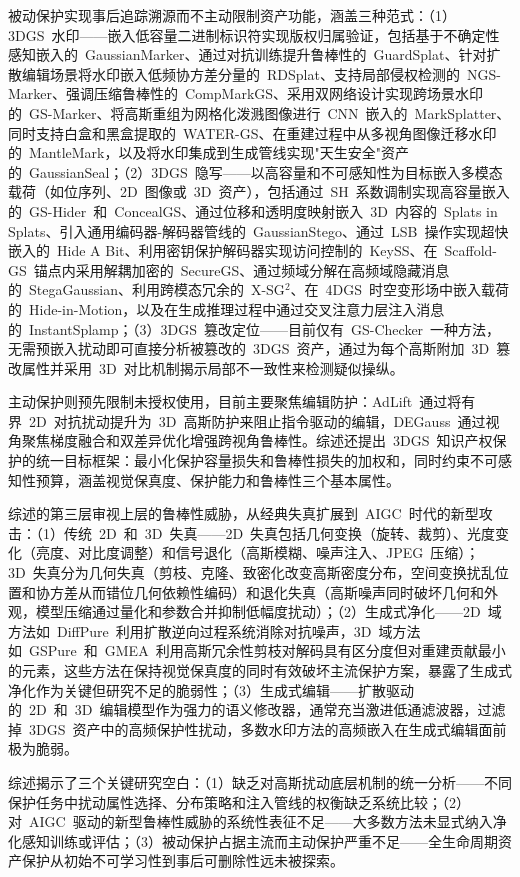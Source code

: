 被动保护实现事后追踪溯源而不主动限制资产功能，涵盖三种范式：（1）3DGS~水印——嵌入低容量二进制标识符实现版权归属验证，包括基于不确定性感知嵌入的~GaussianMarker、通过对抗训练提升鲁棒性的~GuardSplat、针对扩散编辑场景将水印嵌入低频协方差分量的~RDSplat、支持局部侵权检测的~NGS-Marker、强调压缩鲁棒性的~CompMarkGS、采用双网络设计实现跨场景水印的~GS-Marker、将高斯重组为网格化泼溅图像进行~CNN~嵌入的~MarkSplatter、同时支持白盒和黑盒提取的~WATER-GS、在重建过程中从多视角图像迁移水印的~MantleMark，以及将水印集成到生成管线实现"天生安全"资产的~GaussianSeal；（2）3DGS~隐写——以高容量和不可感知性为目标嵌入多模态载荷（如位序列、2D~图像或~3D~资产），包括通过~SH~系数调制实现高容量嵌入的~GS-Hider~和~ConcealGS、通过位移和透明度映射嵌入~3D~内容的~Splats in Splats、引入通用编码器-解码器管线的~GaussianStego、通过~LSB~操作实现超快嵌入的~Hide A Bit、利用密钥保护解码器实现访问控制的~KeySS、在~Scaffold-GS~锚点内采用解耦加密的~SecureGS、通过频域分解在高频域隐藏消息的~StegaGaussian、利用跨模态冗余的~X-SG$^2$、在~4DGS~时空变形场中嵌入载荷的~Hide-in-Motion，以及在生成推理过程中通过交叉注意力层注入消息的~InstantSplamp；（3）3DGS~篡改定位——目前仅有~GS-Checker~一种方法，无需预嵌入扰动即可直接分析被篡改的~3DGS~资产，通过为每个高斯附加~3D~篡改属性并采用~3D~对比机制揭示局部不一致性来检测疑似操纵。

主动保护则预先限制未授权使用，目前主要聚焦编辑防护：AdLift~通过将有界~2D~对抗扰动提升为~3D~高斯防护来阻止指令驱动的编辑，DEGauss~通过视角聚焦梯度融合和双差异优化增强跨视角鲁棒性。综述还提出~3DGS~知识产权保护的统一目标框架：最小化保护容量损失和鲁棒性损失的加权和，同时约束不可感知性预算，涵盖视觉保真度、保护能力和鲁棒性三个基本属性。

综述的第三层审视上层的鲁棒性威胁，从经典失真扩展到~AIGC~时代的新型攻击：（1）传统~2D~和~3D~失真——2D~失真包括几何变换（旋转、裁剪）、光度变化（亮度、对比度调整）和信号退化（高斯模糊、噪声注入、JPEG~压缩）；3D~失真分为几何失真（剪枝、克隆、致密化改变高斯密度分布，空间变换扰乱位置和协方差从而错位几何依赖性编码）和退化失真（高斯噪声同时破坏几何和外观，模型压缩通过量化和参数合并抑制低幅度扰动）；（2）生成式净化——2D~域方法如~DiffPure~利用扩散逆向过程系统消除对抗噪声，3D~域方法如~GSPure~和~GMEA~利用高斯冗余性剪枝对解码具有区分度但对重建贡献最小的元素，这些方法在保持视觉保真度的同时有效破坏主流保护方案，暴露了生成式净化作为关键但研究不足的脆弱性；（3）生成式编辑——扩散驱动的~2D~和~3D~编辑模型作为强力的语义修改器，通常充当激进低通滤波器，过滤掉~3DGS~资产中的高频保护性扰动，多数水印方法的高频嵌入在生成式编辑面前极为脆弱。

综述揭示了三个关键研究空白：（1）缺乏对高斯扰动底层机制的统一分析——不同保护任务中扰动属性选择、分布策略和注入管线的权衡缺乏系统比较；（2）对~AIGC~驱动的新型鲁棒性威胁的系统性表征不足——大多数方法未显式纳入净化感知训练或评估；（3）被动保护占据主流而主动保护严重不足——全生命周期资产保护从初始不可学习性到事后可删除性远未被探索。

